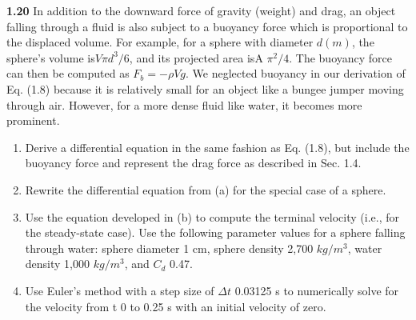 \documentclass[../main.tex]{subfiles}
\begin{document}
\begin{multicols}{2}
\textbf{1.20} In addition to the downward force of gravity (weight)
and drag, an object falling through a fluid is also subject to a
buoyancy force which is proportional to the displaced volume. For example, for a sphere with diameter $d (m)$, the
sphere's volume is$ V  \pi  d^3/6$, and its projected area isA  $\pi ^2/4$. The buoyancy force can then be computed as
$F_b= -\rho Vg$. We neglected buoyancy in our derivation of
Eq. (1.8) because it is relatively small for an object like a
bungee jumper moving through air. However, for a more
dense fluid like water, it becomes more prominent.
\begin{enumerate}[label=(\alph*)]
	\item Derive a differential equation in the same fashion as
	Eq. (1.8), but include the buoyancy force and represent
	the drag force as described in Sec. 1.4.
	\item Rewrite the differential equation from (a) for the special
	case of a sphere.
	\item Use the equation developed in (b) to compute the terminal
	velocity (i.e., for the steady-state case). Use the following
	parameter values for a sphere falling through water:
	sphere diameter  1 cm, sphere density  2,700 $kg/m^3$,
	water density  1,000 $kg/m^3$, and $C_d$  0.47.
	\item Use Euler's method with a step size of $\Delta t $ 0.03125 s to
	numerically solve for the velocity from t  0 to 0.25 s
	with an initial velocity of zero. 
	
\end{enumerate}

\end{multicols}
\end{document}
